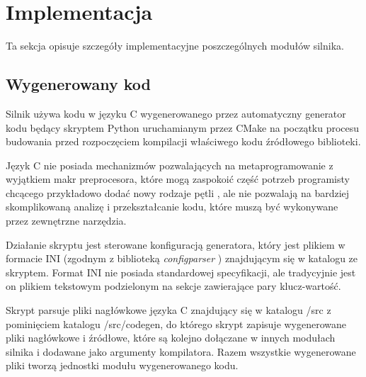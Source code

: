 \section {Implementacja}

Ta sekcja opisuje szczegóły implementacyjne poszczególnych modułów silnika.

\subsection{Wygenerowany kod}

Silnik używa kodu w języku C wygenerowanego przez automatyczny generator kodu będący skryptem Python uruchamianym przez CMake na początku procesu budowania przed rozpoczęciem kompilacji właściwego
kodu źródłowego biblioteki.

Język C nie posiada mechanizmów pozwalających na metaprogramowanie z wyjątkiem makr preprocesora, które mogą zaspokoić część potrzeb programisty chcącego przykładowo dodać nowy rodzaje pętli \cite{METACONTROLC}, ale nie pozwalają na bardziej skomplikowaną analizę i przekształcanie kodu, które muszą być wykonywane przez zewnętrzne narzędzia.

Działanie skryptu jest sterowane konfiguracją generatora, który jest plikiem w formacie INI (zgodnym z biblioteką \textit{configparser} \cite{PYTHONCONFIGPARSER}) znajdującym się w katalogu ze skryptem.
Format INI nie posiada standardowej specyfikacji, ale tradycyjnie jest on plikiem tekstowym podzielonym na sekcje zawierające pary klucz-wartość.

Skrypt parsuje pliki nagłówkowe języka C znajdujący się w katalogu /src z
pominięciem katalogu /src/codegen, do którego skrypt zapisuje wygenerowane pliki nagłówkowe i źródłowe, które są kolejno dołączane w innych modułach silnika i dodawane jako argumenty kompilatora.
Razem wszystkie wygenerowane pliki tworzą jednostki modułu wygenerowanego kodu.


